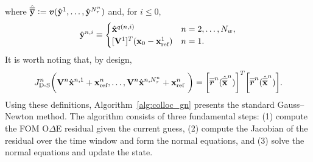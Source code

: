 where $\hat{\overline{\overline{\mathbf{y}}}}^{} \vcentcolon= \boldsymbol v (\hat{\mathbf{y}}^{1},\ldots,\hat{\mathbf{y}}^{N_{\tau}^{n}} )$ and, for $i \le 0$,
\begin{equation}\label{eq:wls_genspatial_direct_args}
\genstateyDiscreteArgnt{n,i}  \equiv 
\begin{cases}
\genstateDiscreteArg{\indexMapper(n,i)}  & n = 2,\ldots,\nslabs,  \\
\genstateICOne  & n = 1. 
\end{cases}
\end{equation}
It is worth noting that, by design, 
\begin{equation*}
J^{n}_{\text{D-S}} \bigg( \mathbf {V}^{n} \hat{\mathbf{x}}^{n,1} + \mathbf{x}_\text{ref}^{n},\ldots,\mathbf {V}^{n} \hat{\mathbf{x}}^{n,N_{\tau}^{n}} + \mathbf{x}_\text{ref}^{n} \ \bigg) 
=
\bigg[\overline{\overline{\boldsymbol r}}^{n}_{\text{}}  (\hat{\overline{\overline{\mathbf {x}}}}^{n}) \bigg]^T \bigg[ \overline{\overline{\boldsymbol r}}^{n}_{\text{}}(\hat{\overline{\overline{\mathbf {x}}}}^{n}) \bigg].
\end{equation*} 
Using these definitions, Algorithm~\ref{alg:colloc_gn} presents the standard Gauss--Newton method. The algorithm consists of three fundamental steps: (1) compute the FOM O$\Delta$E residual given the current guess, (2) compute the Jacobian of the residual over the time window and form the normal equations, and (3) solve the normal equations and update the state. 

